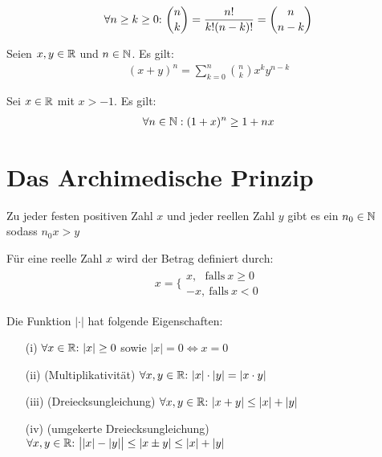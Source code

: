 \begin{frameddefn}
\begin{align*}
	\forall n \geq k \geq 0{:}\  {n\choose k} = \frac{n!}{k! (n-k)!} = {n\choose n-k}
\end{align*}
\end{frameddefn}

\begin{framedthm}
	Seien $x,y \in \mathbb{R}$ und $n \in \mathbb{N}$. Es gilt:
	\begin{align*}
		(x+y)^n = \sum_{k=0}^{n} {n\choose k} x^k y^{n-k}
	\end{align*}
\end{framedthm}


\begin{framedthm}
	Sei $x\in \mathbb{R}$ mit $x > -1$. Es gilt:
	\begin{align*}
		\forall n \in \mathbb{N}: (1 + x)^n \geq 1 + nx
	\end{align*}
\end{framedthm}

\section{Das Archimedische Prinzip}


\begin{framedthm}
	Zu jeder festen positiven Zahl $x$ und jeder reellen Zahl $y$ gibt es ein $n_0 \in \mathbb{N}$ sodass $n_0 x > y$
\end{framedthm}

\begin{frameddefn}[Absolutbetrag]
	Für eine reelle Zahl $x$ wird der Betrag definiert durch:
	\begin{align*}
		x = \biggl\{\begin{array}{ll}
			x, \ \ \ \textrm{falls}\  x \geq 0 \\
			-x, \  \textrm{falls}\  x < 0
		\end{array}
	\end{align*}
\end{frameddefn}

\begin{framedthm}
	Die Funktion $|\cdot|$ hat folgende Eigenschaften:
	\begin{enumerate}
		\item[(i)] $\forall x \in \mathbb{R}{:}\  |x| \geq 0$ sowie $|x| = 0 \iff x = 0$
		\item [(ii)] (Multiplikativität) $\forall x,y \in \mathbb{R}{:}\  |x|\cdot|y| = |x\cdot y|$
		\item[(iii)] (Dreiecksungleichung) $\forall x,y \in \mathbb{R}{:}\  |x+y| \leq |x| + |y|$
		\item[(iv)] (umgekerte Dreiecksungleichung) $\forall x,y \in \mathbb{R}{:}\  \big||x| - |y|\big| \leq |x \pm y| \leq |x| + |y|$
	\end{enumerate}
\end{framedthm}


